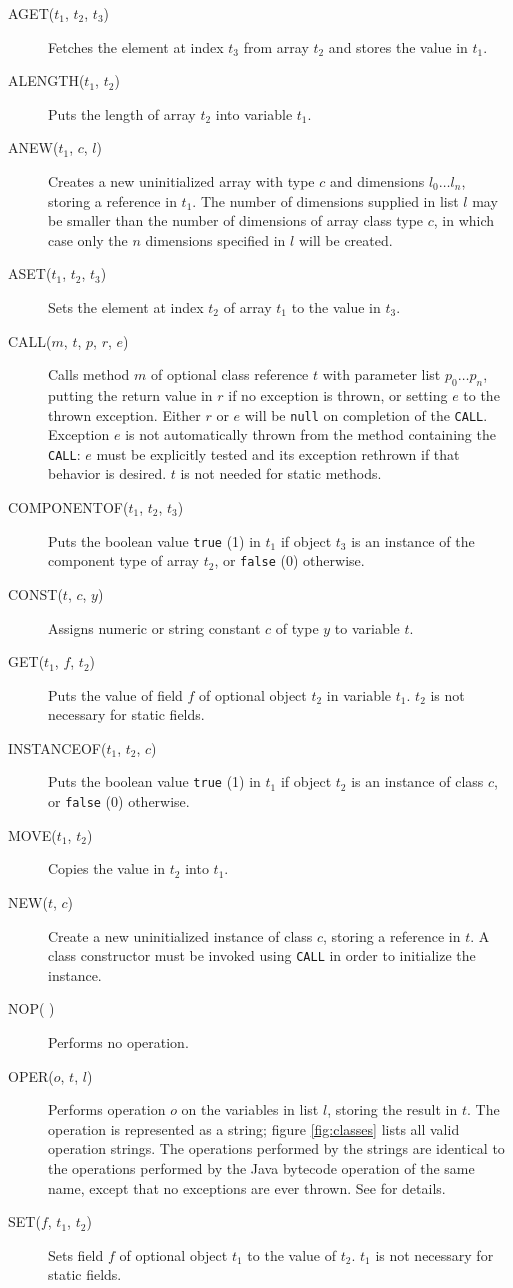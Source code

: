 \documentclass[11pt,notitlepage,twocolumn,twoside]{article}
\begin{document}
\begin{description}
\item[AGET($t_1$, $t_2$, $t_3$)] Fetches the element at index $t_3$
from array $t_2$ and stores the value in $t_1$.
%
\item[ALENGTH($t_1$, $t_2$)] Puts the length of array $t_2$ into
variable $t_1$.
%
\item[ANEW($t_1$, $c$, $l$)] Creates a new uninitialized array with
type $c$ and dimensions $l_0 \ldots l_n$, storing a reference in
$t_1$.  The number of dimensions
supplied in list $l$ may be smaller than the number of dimensions of
array class type $c$, in which case only the $n$ dimensions specified
in $l$ will be created.
%
\item[ASET($t_1$, $t_2$, $t_3$)] Sets the element at index $t_2$ of
array $t_1$ to the value in $t_3$.
%
\item[CALL($m$, $t$, $p$, $r$, $e$)] Calls method $m$ of optional class
reference $t$ with parameter list $p_0 \ldots p_n$, 
putting the return value in $r$
if no exception is thrown, or setting $e$ to the thrown exception.
Either $r$ or $e$ will be \texttt{null} on completion of the
\texttt{CALL}.  Exception $e$ is not automatically thrown from the
method containing the \texttt{CALL}: $e$ must be explicitly tested and
its exception rethrown if that behavior is desired. $t$ is not needed
for static methods.
%
\item[COMPONENTOF($t_1$, $t_2$, $t_3$)] Puts the boolean value
\texttt{true} (1) in $t_1$ if object $t_3$ is an instance of the component
type of array $t_2$, or \texttt{false} (0) otherwise.
%
\item[CONST($t$, $c$, $y$)] Assigns numeric or string constant $c$ of 
type $y$ to variable $t$.
%
\item[GET($t_1$, $f$, $t_2$)] Puts the value of field $f$ of optional
object $t_2$ in variable $t_1$. $t_2$ is not necessary for static fields.
%
\item[INSTANCEOF($t_1$, $t_2$, $c$)] Puts the boolean value
\texttt{true} (1) in $t_1$ if object $t_2$ is an instance of class
$c$, or \texttt{false} (0) otherwise.
%
\item[MOVE($t_1$, $t_2$)] Copies the value in $t_2$ into $t_1$.
%
\item[NEW($t$, $c$)] Create a new uninitialized instance of class $c$,
storing a reference in $t$.  A class constructor must be invoked using
\texttt{CALL} in order to initialize the instance.
%
\item[NOP( )] Performs no operation.
%
\item[OPER($o$, $t$, $l$)] Performs operation $o$ on the variables in
list $l$, storing the result in $t$.  The operation is represented as
a string; figure \ref{fig:classes} lists all valid operation strings.
The operations performed by the strings are identical to the
operations performed by the Java bytecode operation of the same name,
except that no exceptions are ever thrown.  See \cite{jvm} for
details.
%
\item[SET($f$, $t_1$, $t_2$)] Sets field $f$ of optional object $t_1$ to the
value of $t_2$.  $t_1$ is not necessary for static fields.
\end{description}
\end{document}
